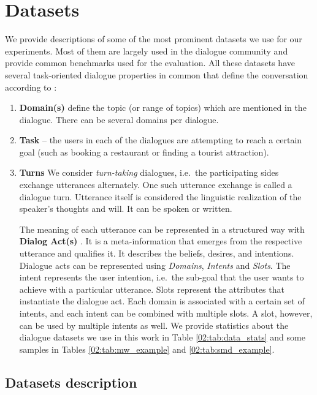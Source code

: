 \section{Datasets}
\label{02:sec:input-data-desc}
We provide descriptions of some of the most prominent datasets we use for our experiments.
Most of them are largely used in the dialogue community and provide common benchmarks used for the evaluation.
All these datasets have several task-oriented dialogue properties in common that define the conversation according to \cite{young2013}:
\begin{enumerate}
\item \textbf{Domain(s)} define the topic (or range of topics) which are mentioned in the dialogue. There can be several domains per dialogue.
\item \textbf{Task} -- the users in each of the dialogues are attempting to reach a certain goal (such as booking a restaurant or finding a tourist attraction).
\item \textbf{Turns} We consider \emph{turn-taking} dialogues, i.e.\ the participating sides exchange utterances alternately.
One such utterance exchange is called a dialogue turn.
Utterance itself is considered the linguistic realization of the speaker's thoughts and will. It can be spoken or written. 

The meaning of each utterance can be represented in a structured way with \textbf{Dialog Act(s)} \cite{Weisser2016}.
It is a meta-information that emerges from the respective utterance and qualifies it. It describes the beliefs, desires, and intentions.
Dialogue acts can be represented using \emph{Domains}, \emph{Intents} and \emph{Slots}. The intent represents the user intention, i.e.\ the sub-goal that the user wants to achieve with a particular utterance.
Slots represent the attributes that instantiate the dialogue act.
Each domain is associated with a certain set of intents, and each intent can be combined with multiple slots. A slot, however, can be used by multiple intents as well.
We provide statistics about the dialogue datasets we use in this work in Table \ref{02:tab:data_stats} and some samples in Tables \ref{02:tab:mw_example} and \ref{02:tab:smd_example}.
\end{enumerate} 

\subsection{Datasets description}
\label{02:sec:data-desc}
